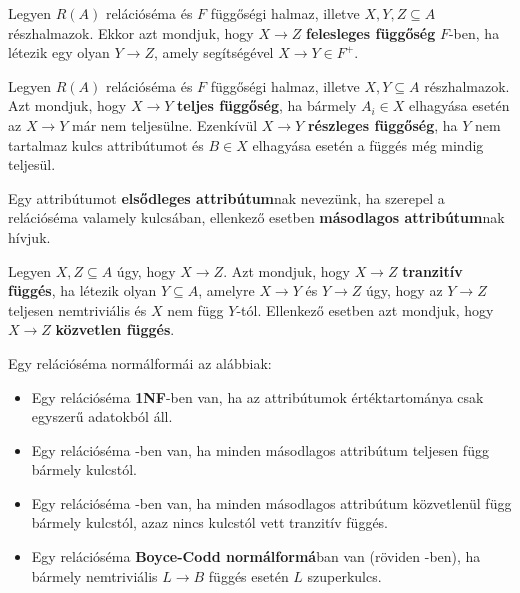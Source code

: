 \begin{defi}
Legyen $R(A)$ relációséma és $F$ függőségi halmaz, illetve $X,Y,Z \subseteq A$ részhalmazok. Ekkor azt mondjuk, hogy $X \longrightarrow Z$ \textbf{felesleges függőség} $F$-ben, ha létezik egy olyan $Y \longrightarrow Z$, amely segítségével $X \longrightarrow Y \in F^+$.
\end{defi}

\begin{defi}
Legyen $R(A)$ relációséma és $F$ függőségi halmaz, illetve $X,Y \subseteq A$ részhalmazok. Azt mondjuk, hogy $X \longrightarrow Y$ \textbf{teljes függőség}, ha bármely $A_i \in X$ elhagyása esetén az $X \longrightarrow Y$ már nem teljesülne. Ezenkívül $X \longrightarrow Y$ \textbf{részleges függőség}, ha $Y$ nem tartalmaz kulcs attribútumot és $B \in X$ elhagyása esetén a függés még mindig teljesül.
\end{defi}

\begin{defi}
Egy attribútumot \textbf{elsődleges attribútum}nak nevezünk, ha szerepel a relációséma valamely kulcsában, ellenkező esetben \textbf{másodlagos attribútum}nak hívjuk.
\end{defi}

\begin{defi}
Legyen $X,Z \subseteq A$ úgy, hogy $X \longrightarrow Z$. Azt mondjuk, hogy $X \longrightarrow Z$ \textbf{tranzitív függés}, ha létezik olyan $Y \subseteq A$, amelyre $X \longrightarrow Y$ és $Y \longrightarrow Z$ úgy, hogy az $Y \longrightarrow Z$ teljesen nemtriviális és $X$ nem függ $Y$-tól. Ellenkező esetben azt mondjuk, hogy $X \longrightarrow Z$ \textbf{közvetlen függés}.
\end{defi}

\begin{defi}[Normálformák]
Egy relációséma normálformái az alábbiak:
\begin{itemize}
    \item Egy relációséma \textbf{1NF}-ben van, ha az attribútumok értéktartománya csak egyszerű adatokból áll.
    \item Egy relációséma \nfk-ben van, ha minden másodlagos attribútum teljesen függ bármely kulcstól.
    \item Egy relációséma \nfh-ben van, ha minden másodlagos attribútum közvetlenül függ bármely kulcstól, azaz nincs kulcstól vett tranzitív függés.
    \item Egy relációséma \textbf{Boyce-Codd normálformá}ban van (röviden \BCNF-ben), ha bármely nemtriviális $L \longrightarrow B$ függés esetén $L$ szuperkulcs.
\end{itemize}
\end{defi}

